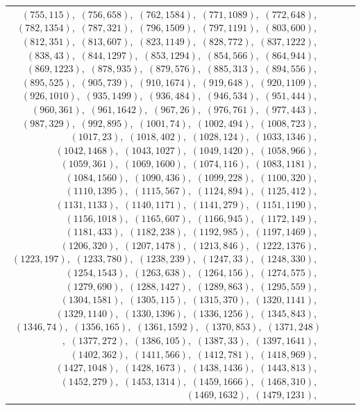 \documentclass[11pt]{article}
\begin{document}
\begin{longtable}{@{}rrl>{\raggedright\arraybackslash}p{}@{}}
$(755,115)$,\allowbreak\ $(756,658)$,\allowbreak\ $(762,1584)$,\allowbreak\ $(771,1089)$,\allowbreak\ $(772,648)$,\allowbreak\ $(782,1354)$,\allowbreak\ $(787,321)$,\allowbreak\ $(796,1509)$,\allowbreak\ $(797,1191)$,\allowbreak\ $(803,600)$,\allowbreak\ $(812,351)$,\allowbreak\ $(813,607)$,\allowbreak\ $(823,1149)$,\allowbreak\ $(828,772)$,\allowbreak\ $(837,1222)$,\allowbreak\ $(838,43)$,\allowbreak\ $(844,1297)$,\allowbreak\ $(853,1294)$,\allowbreak\ $(854,566)$,\allowbreak\ $(864,944)$,\allowbreak\ $(869,1223)$,\allowbreak\ $(878,935)$,\allowbreak\ $(879,576)$,\allowbreak\ $(885,313)$,\allowbreak\ $(894,556)$,\allowbreak\ $(895,525)$,\allowbreak\ $(905,739)$,\allowbreak\ $(910,1674)$,\allowbreak\ $(919,648)$,\allowbreak\ $(920,1109)$,\allowbreak\ $(926,1010)$,\allowbreak\ $(935,1499)$,\allowbreak\ $(936,484)$,\allowbreak\ $(946,534)$,\allowbreak\ $(951,444)$,\allowbreak\ $(960,361)$,\allowbreak\ $(961,1642)$,\allowbreak\ $(967,26)$,\allowbreak\ $(976,761)$,\allowbreak\ $(977,443)$,\allowbreak\ $(987,329)$,\allowbreak\ $(992,895)$,\allowbreak\ $(1001,74)$,\allowbreak\ $(1002,494)$,\allowbreak\ $(1008,723)$,\allowbreak\ $(1017,23)$,\allowbreak\ $(1018,402)$,\allowbreak\ $(1028,124)$,\allowbreak\ $(1033,1346)$,\allowbreak\ $(1042,1468)$,\allowbreak\ $(1043,1027)$,\allowbreak\ $(1049,1420)$,\allowbreak\ $(1058,966)$,\allowbreak\ $(1059,361)$,\allowbreak\ $(1069,1600)$,\allowbreak\ $(1074,116)$,\allowbreak\ $(1083,1181)$,\allowbreak\ $(1084,1560)$,\allowbreak\ $(1090,436)$,\allowbreak\ $(1099,228)$,\allowbreak\ $(1100,320)$,\allowbreak\ $(1110,1395)$,\allowbreak\ $(1115,567)$,\allowbreak\ $(1124,894)$,\allowbreak\ $(1125,412)$,\allowbreak\ $(1131,1133)$,\allowbreak\ $(1140,1171)$,\allowbreak\ $(1141,279)$,\allowbreak\ $(1151,1190)$,\allowbreak\ $(1156,1018)$,\allowbreak\ $(1165,607)$,\allowbreak\ $(1166,945)$,\allowbreak\ $(1172,149)$,\allowbreak\ $(1181,433)$,\allowbreak\ $(1182,238)$,\allowbreak\ $(1192,985)$,\allowbreak\ $(1197,1469)$,\allowbreak\ $(1206,320)$,\allowbreak\ $(1207,1478)$,\allowbreak\ $(1213,846)$,\allowbreak\ $(1222,1376)$,\allowbreak\ $(1223,197)$,\allowbreak\ $(1233,780)$,\allowbreak\ $(1238,239)$,\allowbreak\ $(1247,33)$,\allowbreak\ $(1248,330)$,\allowbreak\ $(1254,1543)$,\allowbreak\ $(1263,638)$,\allowbreak\ $(1264,156)$,\allowbreak\ $(1274,575)$,\allowbreak\ $(1279,690)$,\allowbreak\ $(1288,1427)$,\allowbreak\ $(1289,863)$,\allowbreak\ $(1295,559)$,\allowbreak\ $(1304,1581)$,\allowbreak\ $(1305,115)$,\allowbreak\ $(1315,370)$,\allowbreak\ $(1320,1141)$,\allowbreak\ $(1329,1140)$,\allowbreak\ $(1330,1396)$,\allowbreak\ $(1336,1256)$,\allowbreak\ $(1345,843)$,\allowbreak\ $(1346,74)$,\allowbreak\ $(1356,165)$,\allowbreak\ $(1361,1592)$,\allowbreak\ $(1370,853)$,\allowbreak\ $(1371,248)$,\allowbreak\ $(1377,272)$,\allowbreak\ $(1386,105)$,\allowbreak\ $(1387,33)$,\allowbreak\ $(1397,1641)$,\allowbreak\ $(1402,362)$,\allowbreak\ $(1411,566)$,\allowbreak\ $(1412,781)$,\allowbreak\ $(1418,969)$,\allowbreak\ $(1427,1048)$,\allowbreak\ $(1428,1673)$,\allowbreak\ $(1438,1436)$,\allowbreak\ $(1443,813)$,\allowbreak\ $(1452,279)$,\allowbreak\ $(1453,1314)$,\allowbreak\ $(1459,1666)$,\allowbreak\ $(1468,310)$,\allowbreak\ $(1469,1632)$,\allowbreak\ $(1479,1231)$,\allowbreak\ 
\end{longtable}
\end{document}
